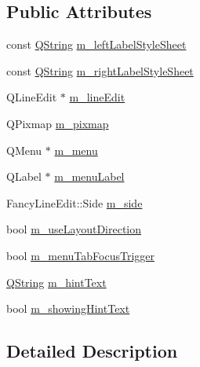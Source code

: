 \subsection*{Public Attributes}
\begin{DoxyCompactItemize}
\item 
const \hyperlink{group___u_a_v_objects_plugin_gab9d252f49c333c94a72f97ce3105a32d}{Q\-String} \hyperlink{class_utils_1_1_fancy_line_edit_private_ac6b25312f607b9026eb121613299c779}{m\-\_\-left\-Label\-Style\-Sheet}
\item 
const \hyperlink{group___u_a_v_objects_plugin_gab9d252f49c333c94a72f97ce3105a32d}{Q\-String} \hyperlink{class_utils_1_1_fancy_line_edit_private_a72ea68074cff6c0179e513bc1c92bcd3}{m\-\_\-right\-Label\-Style\-Sheet}
\item 
Q\-Line\-Edit $\ast$ \hyperlink{class_utils_1_1_fancy_line_edit_private_aa5c668f49cf8d8e523dd5aa4a8f08e3d}{m\-\_\-line\-Edit}
\item 
Q\-Pixmap \hyperlink{class_utils_1_1_fancy_line_edit_private_ad8bbe3f232d24f0176ef6754253b8d3a}{m\-\_\-pixmap}
\item 
Q\-Menu $\ast$ \hyperlink{class_utils_1_1_fancy_line_edit_private_a49c75a34391e9c7eb95f8d2db3629938}{m\-\_\-menu}
\item 
Q\-Label $\ast$ \hyperlink{class_utils_1_1_fancy_line_edit_private_af0626a7a7714a1a52ca2de3284baa07e}{m\-\_\-menu\-Label}
\item 
Fancy\-Line\-Edit\-::\-Side \hyperlink{class_utils_1_1_fancy_line_edit_private_ad60d06ba3fb014847644f73c494245b0}{m\-\_\-side}
\item 
bool \hyperlink{class_utils_1_1_fancy_line_edit_private_a54c91966247b6fded6bf5740e658e9ea}{m\-\_\-use\-Layout\-Direction}
\item 
bool \hyperlink{class_utils_1_1_fancy_line_edit_private_a9db3d32157258337faed26134c440674}{m\-\_\-menu\-Tab\-Focus\-Trigger}
\item 
\hyperlink{group___u_a_v_objects_plugin_gab9d252f49c333c94a72f97ce3105a32d}{Q\-String} \hyperlink{class_utils_1_1_fancy_line_edit_private_a9c00e4643180c89143ef729c7704e8e7}{m\-\_\-hint\-Text}
\item 
bool \hyperlink{class_utils_1_1_fancy_line_edit_private_a283cbbdaa3d8a3b4a2a422e1000f76b0}{m\-\_\-showing\-Hint\-Text}
\end{DoxyCompactItemize}


\subsection{Detailed Description}


